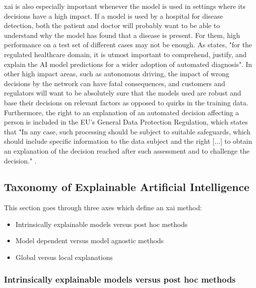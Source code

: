 \documentclass[UKenglish]{uiomasterthesis} %
\theoremstyle{definition}
\begin{document}
\ac{xai} is also especially important whenever the model is used in settings where its decisions have a high impact. If a model is used by a hospital for disease detection, both the patient and doctor will probably want to be able to understand why the model has found that a disease is present. For them, high performance on a test set of different cases may not be enough. As \cite{xaisurvey} states, "for the regulated healthcare domain, it is utmost important to comprehend, justify, and explain the AI model predictions for a wider adoption of automated diagnosis". In other high impact areas, such as autonomous driving, the impact of wrong decisions by the network can have fatal consequences, and customers and regulators will want to be absolutely sure that the models used are robust and base their decisions on relevant factors as opposed to quirks in the training data. Furthermore, the right to an explanation of an automated decision affecting a person is included in the EU's General Data Protection Regulation, which states that "In any case, such processing should be subject to suitable safeguards, which should include specific information to the data subject and the right [...] to obtain an explanation of the decision reached after such assessment and to challenge the decision." \cite{gdpr}.


\subsection{Taxonomy of Explainable Artificial Intelligence}

This section goes through three axes which define an \ac{xai} method:

\begin{itemize}
  \item Intrinsically explainable models versus post hoc methods
  \item Model dependent versus model agnostic methods
  \item Global versus local explanations
\end{itemize}


\subsubsection{Intrinsically explainable models versus post hoc methods}
\end{document}
